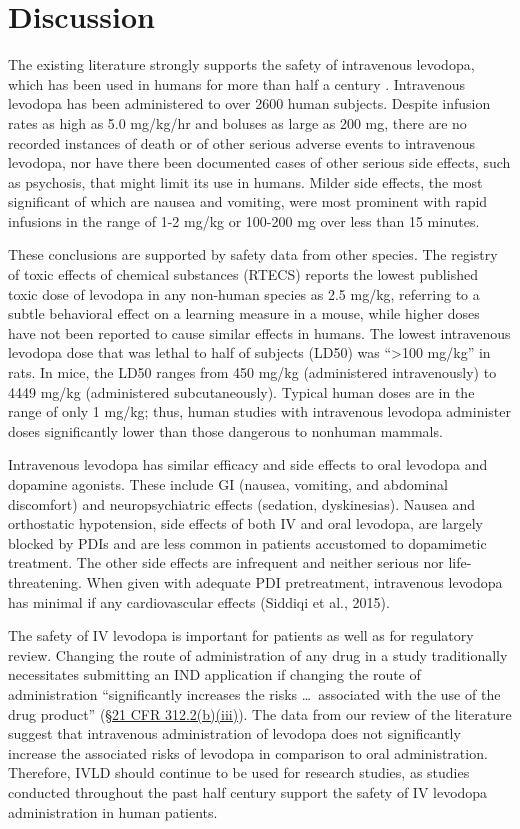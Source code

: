 \section{Discussion}
The existing literature strongly supports the safety of intravenous levodopa, which has been used in humans for more than half a century \cite{14430381}.  Intravenous levodopa has been administered to over 2600 human subjects.  Despite infusion rates as high as 5.0 mg/kg/hr and boluses as large as 200 mg, there are no recorded instances of death or of other serious adverse events to intravenous levodopa, nor have there been documented cases of other serious side effects, such as psychosis, that might limit its use in humans. Milder side effects, the most significant of which are nausea and vomiting, were most prominent with rapid infusions in the range of 1-2 mg/kg or 100-200 mg over less than 15 minutes\cite{5327616,Bbrung_1966,12865145,4555619,6540399,4880674}. 

These conclusions are supported by safety data from other species. The registry of toxic effects of chemical substances (RTECS) reports the lowest published toxic dose of levodopa in any non-human species as 2.5 mg/kg, referring to a subtle behavioral effect on a learning measure in a mouse, while higher doses have not been reported to cause similar effects in humans.  The lowest intravenous levodopa dose that was lethal to half of subjects (LD50) was ``>100 mg/kg'' in rats.  In mice, the LD50 ranges from 450 mg/kg (administered intravenously) to 4449 mg/kg (administered subcutaneously).  Typical human doses are in the range of only 1 mg/kg; thus, human studies with intravenous levodopa administer doses significantly lower than those dangerous to nonhuman mammals. 

Intravenous levodopa has similar efficacy and side effects to oral levodopa\cite{Connolly_2014} and dopamine agonists\cite{Bonuccelli_2008}.  These include GI (nausea, vomiting, and abdominal discomfort) and neuropsychiatric effects (sedation, dyskinesias).  Nausea and orthostatic hypotension, side effects of both IV and oral levodopa, are largely blocked by PDIs and are less common in patients accustomed to dopamimetic treatment.  The other side effects are infrequent and neither serious nor life-threatening\cite{Connolly_2014}. When given with adequate PDI pretreatment, intravenous levodopa has minimal if any cardiovascular effects (Siddiqi et al., 2015).

The safety of IV levodopa is important for patients as well as for regulatory review.  Changing the route of administration of any drug in a study traditionally necessitates submitting an IND application if changing the route of administration “significantly increases the risks \dots\, associated with the use of the drug product” (\href{http://www.accessdata.fda.gov/scripts/cdrh/cfdocs/cfcfr/CFRSearch.cfm?fr=312.2}{\S 21 CFR 312.2(b)(iii)}).  The data from our review of the literature suggest that intravenous administration of levodopa does not significantly increase the associated risks of levodopa in comparison to oral administration.  Therefore, IVLD should continue to be used for research studies, as studies conducted throughout the past half century support the safety of IV levodopa administration in human patients.